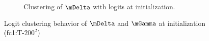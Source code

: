 \begin{figure}[h]
\begin{subfigure}[b]{0.4\textwidth}
        \caption{Clustering of $\mDelta$ with logits at initialization.}
        \label{fig:app_tsne_m_init}
    \end{subfigure}%
    \captionsetup{justification=centering}
    \caption{Logit clustering behavior of $\mDelta$ and $\mGamma$ at initialization (fc1:T-$200^2$)}
    \label{fig:tsne1}
\end{figure}


